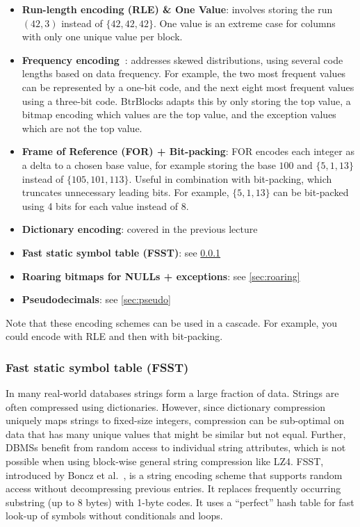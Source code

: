 \documentclass[11pt]{article}
\begin{document}
\begin{itemize}
    \item \textbf{Run-length encoding (RLE) \& One Value}: involves storing the run $(42,3)$ instead of $\{42, 42, 42\}$. One value is an extreme case for columns with only one unique value per block.
    \item \textbf{Frequency encoding~\cite{freq-encoding}}: addresses skewed distributions, using several code lengths based on data frequency. For example, the two most frequent values can be represented by a one-bit code, and the next eight most frequent values using a three-bit code. BtrBlocks adapts this by only storing the top value, a bitmap encoding which values are the top value, and the exception values which are not the top value.
    \item \textbf{Frame of Reference (FOR) + Bit-packing}: FOR encodes each integer as a delta to a chosen base value, for example storing the base $100$ and $\{5,1,13\}$ instead of $\{105,101,113\}$. Useful in combination with bit-packing, which truncates unnecessary leading bits. For example, $\{5,1,13\}$ can be bit-packed using 4 bits for each value instead of 8.
    \item \textbf{Dictionary encoding}: covered in the previous lecture
    \item \textbf{Fast static symbol table (FSST)}: see \cref{sec:fsst}
    \item \textbf{Roaring bitmaps for NULLs + exceptions}: see \cref{sec:roaring}
    \item \textbf{Pseudodecimals}: see \cref{sec:pseudo}
\end{itemize}

Note that these encoding schemes can be used in a cascade. For example, you could encode with RLE and then with bit-packing.

\subsubsection{Fast static symbol table (FSST)}\label{sec:fsst}
In many real-world databases strings form a large fraction of data. Strings are often compressed using dictionaries. However, since dictionary compression uniquely maps strings to fixed-size integers, compression can be sub-optimal on data that has many unique values that might be similar but not equal. Further, DBMSs benefit from random access to individual string attributes, which is not possible when using block-wise general string compression like LZ4. FSST, introduced by Boncz et al.~\cite{fsst}, is a string encoding scheme that supports random access without decompressing previous entries. It replaces frequently occurring substring (up to 8 bytes) with 1-byte codes. It uses a ``perfect'' hash table for fast look-up of symbols without conditionals and loops.
\end{document}
